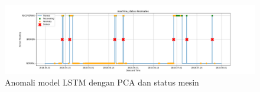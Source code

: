\documentclass[12pt, a4paper, onecolumn, oneside, final]{report}
\begin{document}
    \begin{figure}[h]
        \centerline{\includegraphics[width=1.4\textwidth]{resources/LSTM/LSTM_PCA_machine_status.png}}
        \caption{Anomali model LSTM dengan PCA dan status mesin} \label{wPms}
    \end{figure}


\end{document}
